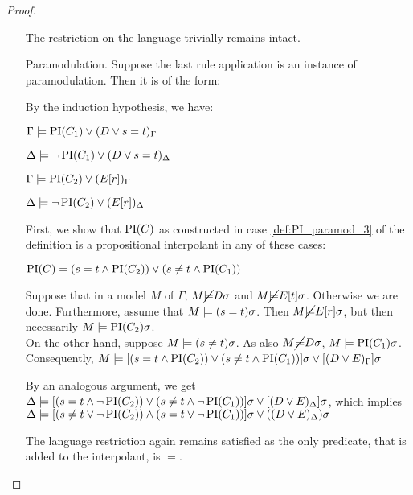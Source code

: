 \begin{proof}
\begin{itemize}
			The restriction on the language trivially remains intact.
			

		\item[Paramodulation.]	
			Suppose the last rule application is an instance of paramodulation. Then it is of the form:
			\begin{prooftree}
			\end{prooftree}

			By the induction hypothesis, we have:

			$\Gamma \models \operatorname{PI}(C_1) \lor (D\lor s=t)_\Gamma$

			$\Delta \models \lnot \operatorname{PI}(C_1) \lor (D\lor s=t)_\Delta$

			$\Gamma \models \operatorname{PI}(C_2) \lor (E[r])_\Gamma$

			$\Delta \models \lnot \operatorname{PI}(C_2) \lor (E[r])_\Delta$

			First, we show that $\operatorname{PI}(C)$ as constructed in case \ref{def:PI_paramod_3} of the definition is a propositional interpolant in any of these cases:

			$\operatorname{PI}(C) = (s=t \land \operatorname{PI}(C_2)) \lor (s\neq t \land \operatorname{PI}(C_1)) $
			
			Suppose that in a model $M$ of $\Gamma$, $M \cancel {\models} D\sigma$ and $M \cancel {\models} E[t]\sigma$. Otherwise we are done.
			Furthermore, assume that $M \models (s=t)\sigma$. Then $M \cancel {\models} E[r]\sigma$, but then necessarily $M \models \operatorname{PI}(C_2)\sigma$. \\
			On the other hand, suppose $M \models (s\neq t)\sigma$. As also $M \cancel {\models} D\sigma$, $M \models \operatorname{PI}(C_1)\sigma$.
			Consequently, $M \models [(s=t \land \operatorname{PI}(C_2)) \lor (s\neq t \land \operatorname{PI}(C_1))]\sigma \lor [(D \lor E)_\Gamma]\sigma$

			By an analogous argument, we get $\Delta \models [(s=t \land \lnot \operatorname{PI}(C_2)) \lor (s\neq t \land \lnot \operatorname{PI}(C_1))]\sigma \lor [(D \lor E)_\Delta]\sigma$,
			which implies
			$\Delta \models [( s\neq t \lor \lnot \operatorname{PI}(C_2)) \land (s = t \lor \lnot \operatorname{PI}(C_1))]\sigma \lor ((D \lor E)_\Delta)\sigma $


			The language restriction again remains satisfied as the only predicate, that is added to the interpolant, is $=$.


\end{itemize}
\end{proof}
